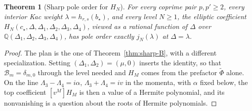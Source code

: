 \documentclass[twoside,10pt]{article}
\numberwithin{equation}{section}
\theoremstyle{slbody}
\newtheorem{theorem}{Theorem}[section]
\theoremstyle{definition}
\theoremstyle{remark}
\begin{document}
\begin{theorem}[Sharp pole order for \(H_N\)]
\label{thm:sharp-H}
For every coprime pair \(p,p'\geq2\), every interior Kac weight
\(\lambda=h_{r,s}(b_\star)\), and every level \(N\geq1\), the elliptic
coefficient \(H_N(c_\star,\Delta,\Delta_1,\Delta_2,\Delta_3,\Delta_4)\),
viewed as a rational function of \(\Delta\) over
\(\mathbb Q(\Delta_1,\Delta_2,\Delta_3,\Delta_4)\), has pole order exactly
\(j_N(\lambda)\) at \(\Delta=\lambda\).
\end{theorem}

\begin{proof}
The plan is the one of Theorem~\ref{thm:sharp-B}, with a different
specialization.  Setting \((\Delta_1,\Delta_2)=(\mu,0)\) inserts the
identity, so that \(\mathcal B_m=\delta_{m,0}\) through the level needed and
\(H_M\) comes from the prefactor \(\widetilde\Phi\) alone.  On the line
\(\Lambda_3-\Lambda_4=i\alpha\), \(\Lambda_3+\Lambda_4=iv\) in the momenta,
with \(\alpha\) fixed below, the top coefficient \([v^M]H_M\)
is then a value of a Hermite polynomial, and its nonvanishing is a question
about the roots of Hermite polynomials.


\end{proof}
\end{document}
